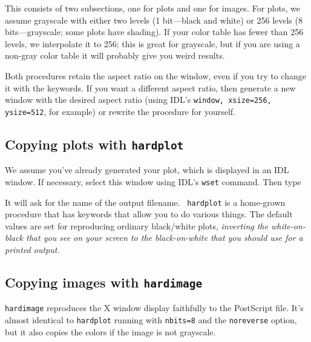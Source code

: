\documentclass[psfig,preprint]{aastex}
\begin{document}
        This consists of two subsections, one for plots and one for
images.  For plots, we assume grayscale with either two levels (1
bit---black and white) or 256 levels (8 bits---grayscale; some plots
have shading).  If your color table has fewer than 256 levels, we
interpolate it to 256; this is great for grayscale, but if you are
using a non-gray color table it will probably give you weird
results.

        Both procedures retain the aspect ratio on the window, even if
you try to change it with the keywords.  If you want a different aspect
ratio, then generate a new window with the desired aspect ratio (using
IDL's {\tt window, xsize=256, ysize=512}, for example) or rewrite the
procedure for yourself.

\subsection{Copying plots with {\tt hardplot}}

We assume you've already generated your plot, which is displayed in an
IDL window.  If necessary, select this window using IDL's {\tt wset}
command.  Then type


\noindent It will ask for the name of the output filename.  {\tt 
hardplot} is a home-grown procedure that has keywords that allow you to
do various things.  The default values are set for reproducing ordinary
black/white plots, {\it inverting the white-on-black that you see on
your screen to the black-on-white that you should use for a printed
output.} 

\subsection{Copying images with {\tt hardimage}}

{\tt hardimage} reproduces the X window display faithfully to the
PostScript file.  It's almost identical to {\tt hardplot} running with
{\tt nbits=8} and the {\tt noreverse} option, but it also copies the
colors if the image is not grayscale.
\end{document}
